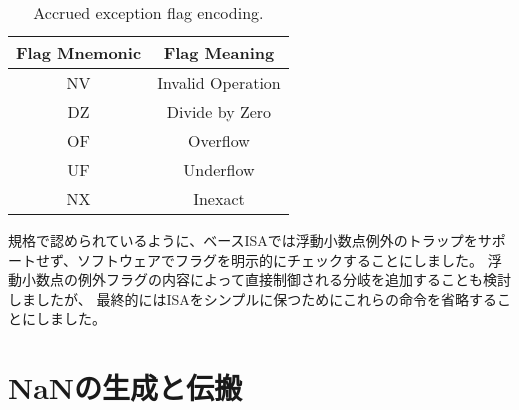\begin{table}[htp]
\begin{small}
\begin{center}
\begin{tabular}{cl}
\hline
\multicolumn{1}{|c|}{Flag Mnemonic} &
\multicolumn{1}{c|}{Flag Meaning} \\
\hline
\multicolumn{1}{|c|}{NV} &
\multicolumn{1}{c|}{Invalid Operation}\\
\hline
\multicolumn{1}{|c|}{DZ} &
\multicolumn{1}{c|}{Divide by Zero}\\
\hline
\multicolumn{1}{|c|}{OF} &
\multicolumn{1}{c|}{Overflow}\\
\hline
\multicolumn{1}{|c|}{UF} &
\multicolumn{1}{c|}{Underflow}\\
\hline
\multicolumn{1}{|c|}{NX} &
\multicolumn{1}{c|}{Inexact}\\
\hline
\end{tabular}
\end{center}
\end{small}
\caption{Accrued exception flag encoding.}
\label{bitdef}
\end{table}

\begin{commentary}
\begin{comment}
As allowed by the standard, we do not support traps on floating-point
exceptions in the base ISA, but instead require explicit checks of the flags
in software.  We considered adding branches controlled directly by the
contents of the floating-point accrued exception flags, but ultimately chose
to omit these instructions to keep the ISA simple.
\end{comment}
規格で認められているように、ベースISAでは浮動小数点例外のトラップをサポートせず、ソフトウェアでフラグを明示的にチェックすることにしました。
浮動小数点の例外フラグの内容によって直接制御される分岐を追加することも検討しましたが、
最終的にはISAをシンプルに保つためにこれらの命令を省略することにしました。
\end{commentary}

\begin{comment}
\section{NaN Generation and Propagation}
\end{comment}
\section{NaNの生成と伝搬}

